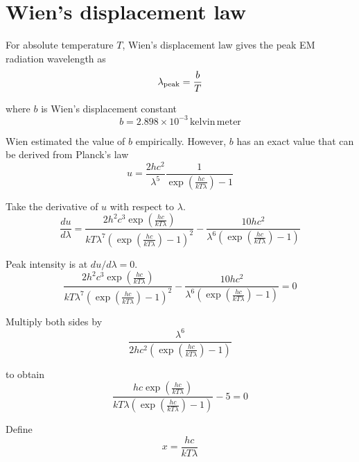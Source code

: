 

\section*{Wien's displacement law}

For absolute temperature $T$, Wien's displacement law gives
the peak EM radiation wavelength as
\begin{equation*}
\lambda_{\rm peak}=\frac{b}{T}
\end{equation*}

where $b$ is Wien's displacement constant
\begin{equation*}
b=2.898\times10^{-3}\,\text{kelvin}\,\text{meter}
\end{equation*}

Wien estimated the value of $b$ empirically.
However, $b$ has an exact value that can be derived from Planck's law
\begin{equation*}
u=\frac{2hc^2}{\lambda^5}\frac{1}{\exp\left(\frac{hc}{kT\lambda}\right)-1}
\end{equation*}

Take the derivative of $u$ with respect to $\lambda$.
\begin{equation*}
\frac{du}{d\lambda}
=\frac{2h^2c^3\exp\left(\frac{hc}{kT\lambda}\right)}
{kT\lambda^7\left(\exp\left(\frac{hc}{kT\lambda}\right)-1\right)^2}
-\frac{10hc^2}{\lambda^6\left(\exp\left(\frac{hc}{kT\lambda}\right)-1\right)}
\end{equation*}

Peak intensity is at $du/d\lambda=0$.
\begin{equation*}
\frac{2h^2c^3\exp\left(\frac{hc}{kT\lambda}\right)}
{kT\lambda^7\left(\exp\left(\frac{hc}{kT\lambda}\right)-1\right)^2}
-\frac{10hc^2}{\lambda^6\left(\exp\left(\frac{hc}{kT\lambda}\right)-1\right)}=0
\end{equation*}

Multiply both sides by
\begin{equation*}
\frac{\lambda^6}{2hc^2\left(\exp\left(\frac{hc}{kT\lambda}\right)-1\right)}
\end{equation*}

to obtain
\begin{equation*}
\frac{hc\exp\left(\frac{hc}{kT\lambda}\right)}
{kT\lambda\left(\exp\left(\frac{hc}{kT\lambda}\right)-1\right)}-5=0
\end{equation*}

Define
\begin{equation*}
x=\frac{hc}{kT\lambda}
\end{equation*}

